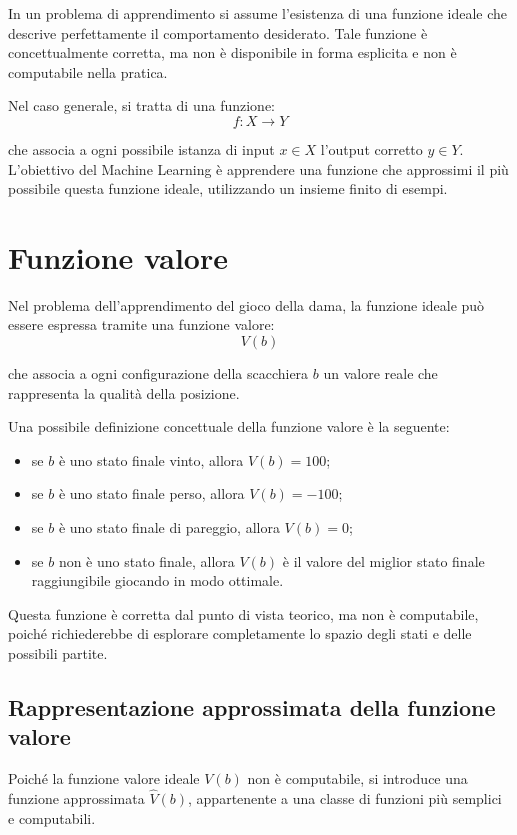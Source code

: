 \documentclass[a4paper,12pt]{report}
\begin{document}
In un problema di apprendimento si assume l’esistenza di una funzione ideale che descrive perfettamente il comportamento desiderato.
Tale funzione è concettualmente corretta, ma non è disponibile in forma esplicita e non è computabile nella pratica.

Nel caso generale, si tratta di una funzione:
\[
f : X \rightarrow Y
\]

che associa a ogni possibile istanza di input \( x \in X \) l’output corretto \( y \in Y \).
L’obiettivo del Machine Learning è apprendere una funzione che approssimi il più possibile questa funzione ideale, utilizzando un insieme finito di esempi.

\section{Funzione valore}

Nel problema dell’apprendimento del gioco della dama, la funzione ideale può essere espressa tramite una funzione valore:
\[
V(b)
\]

che associa a ogni configurazione della scacchiera \( b \) un valore reale che rappresenta la qualità della posizione.

Una possibile definizione concettuale della funzione valore è la seguente:
\begin{itemize}
    \item se \( b \) è uno stato finale vinto, allora \( V(b) = 100 \);
    \item se \( b \) è uno stato finale perso, allora \( V(b) = -100 \);
    \item se \( b \) è uno stato finale di pareggio, allora \( V(b) = 0 \);
    \item se \( b \) non è uno stato finale, allora \( V(b) \) è il valore del miglior stato finale raggiungibile giocando in modo ottimale.
\end{itemize}

Questa funzione è corretta dal punto di vista teorico, ma non è computabile, poiché richiederebbe di esplorare completamente lo spazio degli stati e delle possibili partite.

\subsection{Rappresentazione approssimata della funzione valore}

Poiché la funzione valore ideale \( V(b) \) non è computabile, si introduce una funzione approssimata \( \hat V(b) \), appartenente a una classe di funzioni più semplici e computabili.
\end{document}
